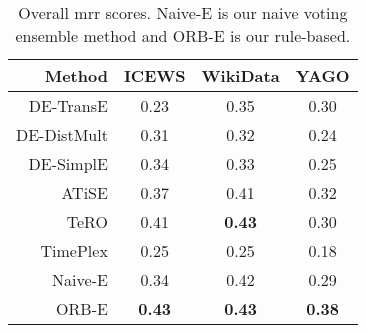 \begin{table}[htb]
\centering
\begin{minipage}{\columnwidthcaption}
\centering
\caption{Overall \gls{mrr} scores. Naive-E is our naive voting ensemble method and ORB-E is our rule-based.}
\vspace{-3mm}

\begin{tabular}{r|ccc} \hline
Method & {\mbox{ICEWS}} & {WikiData} & {YAGO} \\ \hline
DE-TransE & 0.23 & 0.35 & 0.30 \\
DE-DistMult & 0.31 & 0.32 & 0.24 \\
DE-SimplE & 0.34 & 0.33 & 0.25 \\
ATiSE & 0.37 & 0.41 & 0.32 \\
TeRO & 0.41 & \textbf{0.43} & 0.30 \\
TimePlex & 0.25 & 0.25 & 0.18 \\ \hline
Naive-E & 0.34 & 0.42 & 0.29 \\
ORB-E & \textbf{0.43} & \textbf{0.43} & \textbf{0.38} \\
\hline
\end{tabular}

\label{tab:overall_scores}
\end{minipage}
\end{table}

